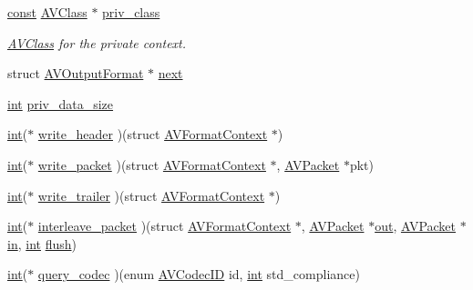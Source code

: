 \begin{DoxyCompactItemize}
\item 
\hyperlink{getopt1_8c_a2c212835823e3c54a8ab6d95c652660e}{const} \hyperlink{struct_a_v_class}{A\+V\+Class} $\ast$ \hyperlink{struct_a_v_output_format_ae030463c5c08de99f8c9e727c822ca87}{priv\+\_\+class}
\begin{DoxyCompactList}\small\item\em \hyperlink{struct_a_v_class}{A\+V\+Class} for the private context. \end{DoxyCompactList}\item 
struct \hyperlink{struct_a_v_output_format}{A\+V\+Output\+Format} $\ast$ \hyperlink{struct_a_v_output_format_a381830276f0c71583a0ca014fcd2fc97}{next}
\item 
\hyperlink{xmltok_8h_a5a0d4a5641ce434f1d23533f2b2e6653}{int} \hyperlink{struct_a_v_output_format_ad7677ef35d272b2dad5498c51b4d2204}{priv\+\_\+data\+\_\+size}
\item 
\hyperlink{xmltok_8h_a5a0d4a5641ce434f1d23533f2b2e6653}{int}($\ast$ \hyperlink{struct_a_v_output_format_aa867a120bd90779111565907b327ba61}{write\+\_\+header} )(struct \hyperlink{struct_a_v_format_context}{A\+V\+Format\+Context} $\ast$)
\item 
\hyperlink{xmltok_8h_a5a0d4a5641ce434f1d23533f2b2e6653}{int}($\ast$ \hyperlink{struct_a_v_output_format_a98fc78e67fc67e6f18d116ead8fb5010}{write\+\_\+packet} )(struct \hyperlink{struct_a_v_format_context}{A\+V\+Format\+Context} $\ast$, \hyperlink{struct_a_v_packet}{A\+V\+Packet} $\ast$pkt)
\item 
\hyperlink{xmltok_8h_a5a0d4a5641ce434f1d23533f2b2e6653}{int}($\ast$ \hyperlink{struct_a_v_output_format_abf35da5f2d210523507001ca0fa26a48}{write\+\_\+trailer} )(struct \hyperlink{struct_a_v_format_context}{A\+V\+Format\+Context} $\ast$)
\item 
\hyperlink{xmltok_8h_a5a0d4a5641ce434f1d23533f2b2e6653}{int}($\ast$ \hyperlink{struct_a_v_output_format_ab26b14e9f3c16220e8e8ce34b3a3fddc}{interleave\+\_\+packet} )(struct \hyperlink{struct_a_v_format_context}{A\+V\+Format\+Context} $\ast$, \hyperlink{struct_a_v_packet}{A\+V\+Packet} $\ast$\hyperlink{latency_8c_a71fd1c281affec034757279e4f91c50b}{out}, \hyperlink{struct_a_v_packet}{A\+V\+Packet} $\ast$\hyperlink{latency_8c_a7d946209d777cb95fe30364b8d321207}{in}, \hyperlink{xmltok_8h_a5a0d4a5641ce434f1d23533f2b2e6653}{int} \hyperlink{mm_8c_a16c5a58c6350aaae15268b27e4e5d5ba}{flush})
\item 
\hyperlink{xmltok_8h_a5a0d4a5641ce434f1d23533f2b2e6653}{int}($\ast$ \hyperlink{struct_a_v_output_format_a2622bb891412cf52010a54afb622abc9}{query\+\_\+codec} )(enum \hyperlink{group__lavc__core_gaadca229ad2c20e060a14fec08a5cc7ce}{A\+V\+Codec\+ID} id, \hyperlink{xmltok_8h_a5a0d4a5641ce434f1d23533f2b2e6653}{int} std\+\_\+compliance)

\end{DoxyCompactItemize}
